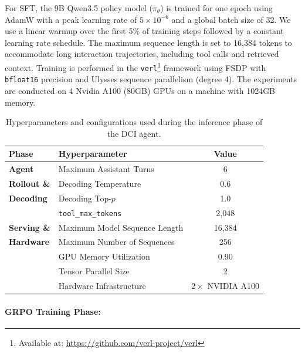 \documentclass{article} %
\begin{document}
For SFT, the 9B Qwen3.5 policy model ($\pi_\theta$) is trained for one epoch using AdamW \citep{loshchilov2018decoupled} with a peak learning rate of $5 \times 10^{-6}$ and a global batch size of 32. We use a linear warmup over the first 5\% of training steps followed by a constant learning rate schedule. The maximum sequence length is set to 16,384 tokens to accommodate long interaction trajectories, including tool calls and retrieved context. Training is performed in the \texttt{verl}\footnote{Available at: \url{https://github.com/verl-project/verl}} framework using FSDP \citep{zhao2023pytorchfsdpexperiencesscaling} with \texttt{bfloat16} precision and Ulysses sequence parallelism (degree 4). The experiments are conducted on 4 Nvidia A100 (80GB) GPUs on a machine with 1024GB memory.

\begin{table}[!t]
\centering
\caption{Hyperparameters and configurations used during the inference phase of the DCI agent.}
\label{tab:hyperparams-inference}
\begin{tabular}{llc}
\toprule
\textbf{Phase} & \textbf{Hyperparameter} & \textbf{Value} \\
\midrule
\textbf{Agent} 
& Maximum Assistant Turns & 6 \\
\textbf{Rollout \&} 
& Decoding Temperature & 0.6 \\
\textbf{Decoding} 
& Decoding Top-$p$ & 1.0 \\
& \texttt{tool\_max\_tokens} & 2,048 \\
\midrule
\textbf{Serving \&} 
& Maximum Model Sequence Length & 16,384 \\
\textbf{Hardware} 
& Maximum Number of Sequences & 256 \\
& GPU Memory Utilization & 0.90 \\
& Tensor Parallel Size & 2 \\
& Hardware Infrastructure & $2\times$ NVIDIA A100 \\
\bottomrule
\end{tabular}
\end{table}




\paragraph{GRPO Training Phase:}
\end{document}

